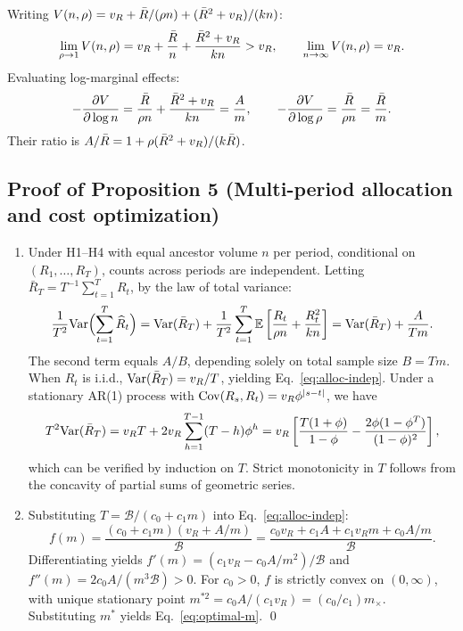 Writing $V(n, \rho) = v_R + \bar{R}/(\rho n) + (\bar{R}^2 + v_R)/(kn)$:
\begin{equation}
  \lim_{\rho \to 1} V(n, \rho) = v_R + \frac{\bar{R}}{n} + \frac{\bar{R}^2 + v_R}{kn} > v_R, \qquad
  \lim_{n \to \infty} V(n, \rho) = v_R.
\end{equation}
Evaluating log-marginal effects:
\begin{equation}
  -\frac{\partial V}{\partial \log n} = \frac{\bar{R}}{\rho n} + \frac{\bar{R}^2 + v_R}{kn} = \frac{A}{m}, \qquad
  -\frac{\partial V}{\partial \log \rho} = \frac{\bar{R}}{\rho n} = \frac{\bar{R}}{m}.
\end{equation}
Their ratio is $A/\bar{R} = 1 + \rho(\bar{R}^2 + v_R)/(k\bar{R})$.

\subsection{Proof of Proposition 5 (Multi-period allocation and cost optimization)}
\label{sec:proof-prop5}

\begin{enumerate}[label=(\roman*)]
  \item Under H1--H4 with equal ancestor volume $n$ per period, conditional on $(R_1, \dots, R_T)$, counts across periods are independent. Letting $\bar{R}_T = T^{-1}\sum_{t=1}^T R_t$, by the law of total variance:
  \begin{equation}
    \frac{1}{T^2}\mathrm{Var}\Bigl(\sum_{t=1}^T \widehat{R}_t\Bigr) = \mathrm{Var}(\bar{R}_T) + \frac{1}{T^2}\sum_{t=1}^T \mathbb{E}\left[\frac{R_t}{\rho n} + \frac{R_t^2}{kn}\right] = \mathrm{Var}(\bar{R}_T) + \frac{A}{Tm}.
  \end{equation}
  The second term equals $A/B$, depending solely on total sample size $B = Tm$. When $R_t$ is i.i.d., $\mathrm{Var}(\bar{R}_T) = v_R/T$, yielding Eq.~\eqref{eq:alloc-indep}.
  Under a stationary AR(1) process with $\mathrm{Cov}(R_s, R_t) = v_R \phi^{|s-t|}$, we have
  \begin{equation}
    T^2\mathrm{Var}(\bar{R}_T) = v_R T + 2v_R \sum_{h=1}^{T-1}(T-h)\phi^h = v_R\left[\frac{T(1+\phi)}{1-\phi} - \frac{2\phi(1-\phi^T)}{(1-\phi)^2}\right],
  \end{equation}
  which can be verified by induction on $T$. Strict monotonicity in $T$ follows from the concavity of partial sums of geometric series.
  \item Substituting $T = \mathcal{B}/(c_0 + c_1m)$ into Eq.~\eqref{eq:alloc-indep}:
  \begin{equation}
    f(m) = \frac{(c_0 + c_1m)(v_R + A/m)}{\mathcal{B}} = \frac{c_0v_R + c_1A + c_1v_Rm + c_0A/m}{\mathcal{B}}.
  \end{equation}
  Differentiating yields $f'(m) = (c_1v_R - c_0A/m^2)/\mathcal{B}$ and $f''(m) = 2c_0A/(m^3\mathcal{B}) > 0$. For $c_0 > 0$, $f$ is strictly convex on $(0, \infty)$, with unique stationary point $m^{*2} = c_0A/(c_1v_R) = (c_0/c_1)m_\times$. Substituting $m^*$ yields Eq.~\eqref{eq:optimal-m}. \qed
\end{enumerate}

